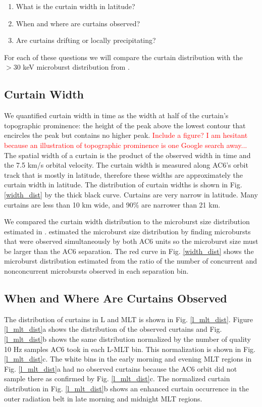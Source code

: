 \documentclass[draft]{agujournal2019}
\begin{document}
\begin{enumerate}
\item What is the curtain width in latitude?
\item When and where are curtains observed?
\item Are curtains drifting or locally precipitating?
\end{enumerate} For each of these questions we will compare the curtain distribution with the $>30$ keV microburst distribution from .

\subsection{Curtain Width}
We quantified curtain width in time as the width at half of the curtain's topographic prominence: the height of the peak above the lowest contour that encircles the peak but contains no higher peak. \textcolor{red}{Include a figure? I am hesitant because an illustration of topographic prominence is one Google search away...} The spatial width of a curtain is the product of the observed width in time and the 7.5 km/s orbital velocity. The curtain width is measured along AC6's orbit track that is mostly in latitude, therefore these widths are approximately the curtain width in latitude. The distribution of curtain widths is shown in Fig. \ref{width_dist} by the thick black curve. Curtains are very narrow in latitude. Many curtains are less than 10 km wide, and 90\% are narrower than 21 km.
	
We compared the curtain width distribution to the microburst size distribution estimated in .  estimated the microburst size distribution by finding microbursts that were observed simultaneously by both AC6 units so the microburst size must be larger than the AC6 separation. The red curve in Fig. \ref{width_dist} shows the microburst distribution estimated from the ratio of the number of concurrent and nonconcurrent microbursts observed in each separation bin. 

\subsection{When and Where Are Curtains Observed}
The distribution of curtains in L and MLT is shown in Fig. \ref{l_mlt_dist}. Figure \ref{l_mlt_dist}a shows the distribution of the observed curtains and Fig. \ref{l_mlt_dist}b shows the same distribution normalized by the number of quality 10 Hz samples AC6 took in each L-MLT bin. This normalization is shown in Fig. \ref{l_mlt_dist}c. The white bins in the early morning and evening MLT regions in Fig. \ref{l_mlt_dist}a had no observed curtains because the AC6 orbit did not sample there as confirmed by Fig. \ref{l_mlt_dist}c. The normalized curtain distribution in Fig. \ref{l_mlt_dist}b shows an enhanced curtain occurrence in the outer radiation belt in late morning and midnight MLT regions.
\end{document}
